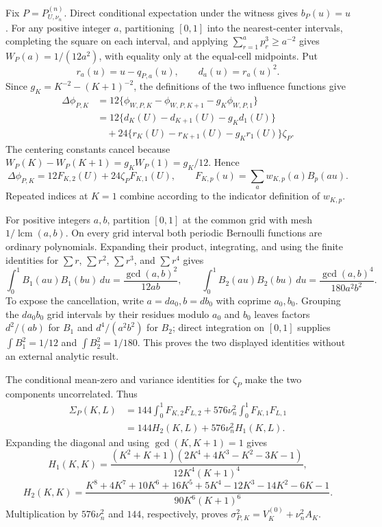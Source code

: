Fix \(P=P_{U,\nu_n}^{(n)}\).  Direct conditional expectation under the witness gives \(b_P(u)=u\).  For any positive integer \(a\), partitioning \([0,1]\) into the nearest-center intervals, completing the square on each interval, and applying \(\sum_{r=1}^ap_r^3\geq a^{-2}\) gives \(W_P(a)=1/(12a^2)\), with equality only at the equal-cell midpoints.  Put
\[
 r_a(u)=u-q_{P,a}(u),\qquad d_a(u)=r_a(u)^2.
\]
Since \(g_K=K^{-2}-(K+1)^{-2}\), the definitions of the two influence functions give
\[
 \begin{aligned}
 \Delta\phi_{P,K}
 &=12\{\phi_{W,P,K}-\phi_{W,P,K+1}-g_K\phi_{W,P,1}\}\\
 &=12\{d_K(U)-d_{K+1}(U)-g_Kd_1(U)\}\\
 &\quad+24\{r_K(U)-r_{K+1}(U)-g_Kr_1(U)\}\zeta_P.
 \end{aligned}
\]
The centering constants cancel because \(W_P(K)-W_P(K+1)=g_KW_P(1)=g_K/12\).  Hence
\[
 \Delta\phi_{P,K}=12F_{K,2}(U)+24\zeta_PF_{K,1}(U),\qquad
 F_{K,p}(u)=\sum_aw_{K,p}(a)B_p(au).
\]
Repeated indices at \(K=1\) combine according to the indicator definition of \(w_{K,p}\).

For positive integers \(a,b\), partition \([0,1]\) at the common grid with mesh \(1/\operatorname{lcm}(a,b)\).  On every grid interval both periodic Bernoulli functions are ordinary polynomials.  Expanding their product, integrating, and using the finite identities for \(\sum r\), \(\sum r^2\), \(\sum r^3\), and \(\sum r^4\) gives
\[
 \int_0^1B_1(au)B_1(bu)\,du=\frac{\gcd(a,b)^2}{12ab},\qquad
 \int_0^1B_2(au)B_2(bu)\,du=\frac{\gcd(a,b)^4}{180a^2b^2}.
\]
To expose the cancellation, write \(a=da_0,b=db_0\) with coprime \(a_0,b_0\).  Grouping the \(da_0b_0\) grid intervals by their residues modulo \(a_0\) and \(b_0\) leaves factors \(d^2/(ab)\) for \(B_1\) and \(d^4/(a^2b^2)\) for \(B_2\); direct integration on \([0,1]\) supplies \(\int B_1^2=1/12\) and \(\int B_2^2=1/180\).  This proves the two displayed identities without an external analytic result.

The conditional mean-zero and variance identities for \(\zeta_P\) make the two components uncorrelated.  Thus
\[
 \begin{aligned}
 \Sigma_P(K,L)
 &=144\int_0^1F_{K,2}F_{L,2}
 +576\nu_n^2\int_0^1F_{K,1}F_{L,1}\\
 &=144H_2(K,L)+576\nu_n^2H_1(K,L).
 \end{aligned}
\]
Expanding the diagonal and using \(\gcd(K,K+1)=1\) gives
\[
 H_1(K,K)=\frac{(K^2+K+1)(2K^4+4K^3-K^2-3K-1)}
 {12K^4(K+1)^4},
\]
\[
 H_2(K,K)=\frac{K^8+4K^7+10K^6+16K^5+5K^4-12K^3-14K^2-6K-1}
 {90K^6(K+1)^6}.
\]
Multiplication by \(576\nu_n^2\) and \(144\), respectively, proves \(\sigma_{P,K}^2=V_K^{(0)}+\nu_n^2A_K\).


